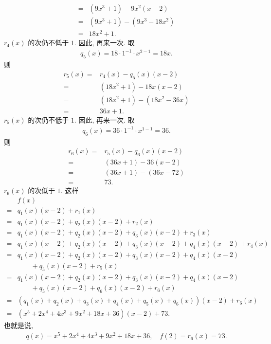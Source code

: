 \begin{example}
\begin{align*}
        = {} & (9x^3 + 1) - 9x^2 (x - 2)   \\
        = {} & (9x^3 + 1) - (9x^3 - 18x^2) \\
        = {} & 18x^2 + 1.
    \end{align*}
    $r_4 (x)$ 的次仍不低于 $1$. 因此, 再来一次. 取
    \begin{align*}
        q_5 (x) = 18 \cdot 1^{-1} \cdot x^{2-1} = 18x.
    \end{align*}
    则
    \begin{align*}
        r_5 (x)
        = {} & r_4 (x) - q_5 (x) (x - 2)   \\
        = {} & (18x^2 + 1) - 18x (x - 2)   \\
        = {} & (18x^2 + 1) - (18x^2 - 36x) \\
        = {} & 36x + 1.
    \end{align*}
    $r_5 (x)$ 的次仍不低于 $1$. 因此, 再来一次. 取
    \begin{align*}
        q_6 (x) = 36 \cdot 1^{-1} \cdot x^{1-1} = 36.
    \end{align*}
    则
    \begin{align*}
        r_6 (x)
        = {} & r_5 (x) - q_6 (x) (x - 2) \\
        = {} & (36x + 1) - 36 (x - 2)    \\
        = {} & (36x + 1) - (36x - 72)    \\
        = {} & 73.
    \end{align*}
    $r_6 (x)$ 的次低于 $1$. 这样
    \begin{align*}
             & f(x)                                                                        \\
        = {} & q_1 (x) (x-2) + r_1 (x)                                                     \\
        = {} & q_1 (x) (x-2) + q_2 (x) (x-2) + r_2 (x)                                     \\
        = {} & q_1 (x) (x-2) + q_2 (x) (x-2) + q_3 (x) (x-2) + r_3 (x)                     \\
        = {} & q_1 (x) (x-2) + q_2 (x) (x-2) + q_3 (x) (x-2) + q_4 (x) (x-2) + r_4 (x)     \\
        = {} & q_1 (x) (x-2) + q_2 (x) (x-2) + q_3 (x) (x-2) + q_4 (x) (x-2)               \\
             & \qquad + q_5 (x) (x-2) + r_5 (x)                                            \\
        = {} & q_1 (x) (x-2) + q_2 (x) (x-2) + q_3 (x) (x-2) + q_4 (x) (x-2)               \\
             & \qquad + q_5 (x) (x-2) + q_6 (x) (x-2) + r_6 (x)                            \\
        = {} & (q_1 (x) + q_2 (x) + q_3 (x) + q_4 (x) + q_5 (x) + q_6 (x)) (x-2) + r_6 (x) \\
        = {} & (x^5 + 2x^4 + 4x^3 + 9x^2 + 18x + 36) (x-2) + 73.
    \end{align*}
    也就是说,
    \begin{align*}
        q(x) = x^5 + 2x^4 + 4x^3 + 9x^2 + 18x + 36, \quad f(2) = r_6 (x) = 73.
    \end{align*}


\end{example}
